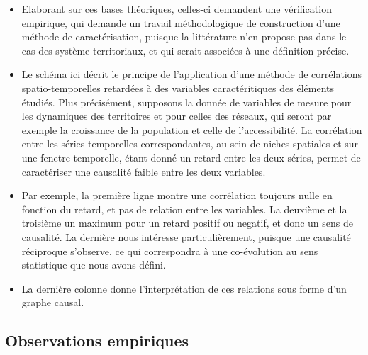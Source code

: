 \documentclass[11pt]{article}
\begin{document}
\begin{itemize}
	\item Elaborant sur ces bases théoriques, celles-ci demandent une vérification empirique, qui demande un travail méthodologique de construction d'une méthode de caractérisation, puisque la littérature n'en propose pas dans le cas des système territoriaux, et qui serait associées à une définition précise.
	\item Le schéma ici décrit le principe de l'application d'une méthode de corrélations spatio-temporelles retardées à des variables caractéritiques des éléments étudiés. Plus précisément, supposons la donnée de variables de mesure pour les dynamiques des territoires et pour celles des réseaux, qui seront par exemple la croissance de la population et celle de l'accessibilité. La corrélation entre les séries temporelles correspondantes, au sein de niches spatiales et sur une fenetre temporelle, étant donné un retard entre les deux séries, permet de caractériser une causalité faible entre les deux variables.
	\item Par exemple, la première ligne montre une corrélation toujours nulle en fonction du retard, et pas de relation entre les variables. La deuxième et la troisième un maximum pour un retard positif ou negatif, et donc un sens de causalité. La dernière nous intéresse particulièrement, puisque une causalité réciproque s'observe, ce qui correspondra à une co-évolution au sens statistique que nous avons défini.
	\item La dernière colonne donne l'interprétation de ces relations sous forme d'un graphe causal.
\end{itemize}



\subsection*{Observations empiriques}
\end{document}
